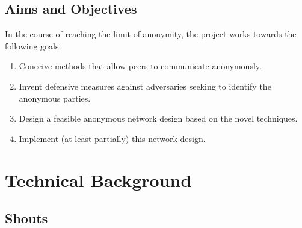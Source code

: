 \documentclass[ %
                    author={Luke Murray},
                supervisor={Dr. Simon Hollis},
                     title={Shadow Peer-to-Peer Networks},
                  subtitle={},
                    degree={MEng},
                      year={2013} ]{thesis}
\begin{document}
\section{Aims and Objectives}

In the course of reaching the limit of anonymity, the project works towards the following goals. 

\begin{enumerate}
\item Conceive methods that allow peers to communicate anonymously.
\item Invent defensive measures against adversaries seeking to identify the anonymous parties.
\item Design a feasible anonymous network design based on the novel techniques.
\item Implement (at least partially) this network design.
\end{enumerate}


\chapter{Technical Background}
\label{chap:technical}

\section{Shouts}
\end{document}
